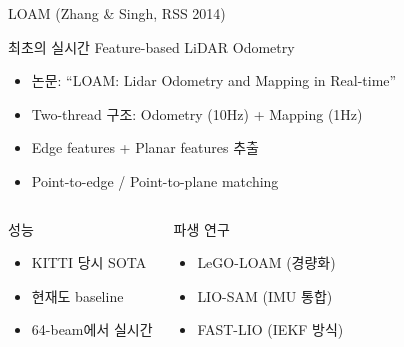 \begin{frame}{LOAM (Zhang \& Singh, RSS 2014)}
  \begin{block}{최초의 실시간 Feature-based LiDAR Odometry}
    \begin{itemize}
      \item 논문: ``LOAM: Lidar Odometry and Mapping in Real-time''
      \item Two-thread 구조: Odometry (10Hz) + Mapping (1Hz)
      \item Edge features + Planar features 추출
      \item Point-to-edge / Point-to-plane matching
    \end{itemize}
  \end{block}
  \pause
  \begin{columns}
    \begin{block}{성능}
      \begin{itemize}
        \item KITTI 당시 SOTA
        \item 현재도 baseline
        \item 64-beam에서 실시간
      \end{itemize}
    \end{block}
    \begin{exampleblock}{파생 연구}
      \begin{itemize}
        \item LeGO-LOAM (경량화)
        \item LIO-SAM (IMU 통합)
        \item FAST-LIO (IEKF 방식)
      \end{itemize}
    \end{exampleblock}
  \end{columns}
\end{frame}

